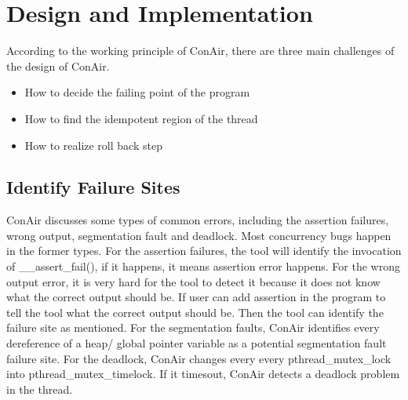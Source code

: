 \section{Design and Implementation}
\label{chp:Design}
According to the working principle of ConAir, there are three main challenges of the design of ConAir.
\begin{itemize}
\item
How to decide the failing point of the program
\item
How to find the idempotent region of the thread
\item
How to realize roll back step
\end{itemize}
\subsection{Identify Failure Sites}
ConAir discusses some types of common errors, including the assertion failures, wrong output, segmentation fault and deadlock. Most concurrency bugs happen in the former types. For the assertion failures, the tool will identify the invocation of \_\_assert\_fail(), if it happens, it means assertion error happens. For the wrong output error, it is very hard for the tool to detect it because it does not know what the correct output should be. If user can add assertion in the program to tell the tool what the correct output should be. Then the tool can identify the failure site as mentioned. For the segmentation faults, ConAir identifies every dereference of a heap/ global pointer variable as a  potential segmentation fault failure site. For the deadlock, ConAir changes every every pthread\_mutex\_lock into pthread\_mutex\_timelock. If it timesout, ConAir detects a deadlock problem in the thread.
